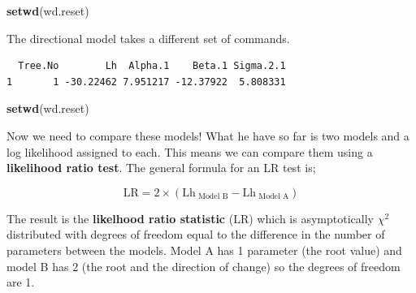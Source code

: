 \documentclass[
]{book}
\newenvironment{Shaded}{\begin{snugshade}}{\end{snugshade}}
\newcommand{\DecValTok}[1]{\textcolor[rgb]{0.00,0.00,0.81}{#1}}
\newcommand{\KeywordTok}[1]{\textcolor[rgb]{0.13,0.29,0.53}{\textbf{#1}}}
\newcommand{\NormalTok}[1]{#1}
\newcommand{\OperatorTok}[1]{\textcolor[rgb]{0.81,0.36,0.00}{\textbf{#1}}}
\newcommand{\StringTok}[1]{\textcolor[rgb]{0.31,0.60,0.02}{#1}}
\begin{document}
\begin{Shaded}
\begin{Highlighting}[]
\KeywordTok{setwd}\NormalTok{(wd.reset)}
\end{Highlighting}
\end{Shaded}

The directional model takes a different set of commands.

\begin{Shaded}
\end{Shaded}

\begin{verbatim}
  Tree.No        Lh  Alpha.1    Beta.1 Sigma.2.1
1       1 -30.22462 7.951217 -12.37922  5.808331
\end{verbatim}

\begin{Shaded}
\begin{Highlighting}[]
\KeywordTok{setwd}\NormalTok{(wd.reset)}
\end{Highlighting}
\end{Shaded}

Now we need to compare these models! What he have so far is two models and a log likelihood assigned to each. This means we can compare them using a \textbf{likelihood ratio test}. The general formula for an LR test is;

\[\text{LR}=2\times(\text{Lh}_{\text{ Model B}} - \text{Lh}_{\text{ Model A}})\]

The result is the \textbf{likelhood ratio statistic} (LR) which is asymptotically \(\chi^2\) distributed with degrees of freedom equal to the difference in the number of parameters between the models. Model A has 1 parameter (the root value) and model B has 2 (the root and the direction of change) so the degrees of freedom are 1.

\begin{Shaded}
\end{Shaded}
\end{document}
